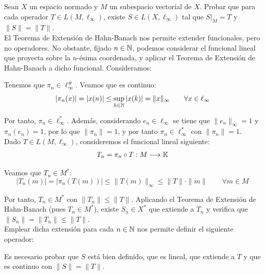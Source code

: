 \begin{ejercicio}
Sean $X$ un espacio normado y $M$ un subespacio vectorial de $X$. Probar que para cada operador $T \in L(M, \ell_\infty)$, existe $S \in L(X, \ell_\infty)$ tal que $S|_M = T$ y $\|S\| = \|T\|$.\\

    El Teorema de Extensión de Hahn-Banach nos permite extender funcionales, pero no operadores. No obstante, fijado $n\in \mathbb{N}$, podemos considerar el funcional lineal que proyecta sobre la $n$-ésima coordenada, y aplicar el Teorema de Extensión de Hahn-Banach a dicho funcional. Consideramos:

    Tenemos que $\pi_n \in \ell_\infty^{\#}$. Veamos que es continuo:
    \begin{equation*}
        |\pi_n(x)| = |x(n)| \leq \sup_{k \in \mathbb{N}} |x(k)| = \|x\|_\infty\qquad \forall x \in \ell_\infty
    \end{equation*}

    Por tanto, $\pi_n\in \ell_\infty^*$. Además, considerando $e_n \in \ell_\infty$ se tiene que $\|e_n\|_\infty = 1$ y $\pi_n(e_n) = 1$, por lo que $\|\pi_n\| = 1$, y por tanto $\pi_n \in \ell_\infty^*$ con $\|\pi_n\| = 1$.\\

    Dado $T \in L(M, \ell_\infty)$, consideremos el funcional lineal siguiente:
    \begin{align*}
        T_n = \pi_n \circ T: M \longrightarrow \mathbb{K}
    \end{align*}

    Veamos que $T_n \in M^*$:
    \begin{equation*}
        |T_n(m)| = |\pi_n(T(m))| \leq \|T(m)\|_\infty \leq \|T\| \cdot \|m\|\qquad \forall m \in M
    \end{equation*}

    Por tanto, $T_n \in M^*$ con $\|T_n\| \leq \|T\|$. Aplicando el Teorema de Extensión de Hahn-Banach (pues $T_n \in M^*$), existe $S_n \in X^*$ que extiende a $T_n$ y verifica que $\|S_n\| = \|T_n\| \leq \|T\|$.\\

    Emplear dicha extensión para cada $n \in \mathbb{N}$ nos permite definir el siguiente operador:

    Es necesario probar que $S$ está bien definido, que es lineal, que extiende a $T$ y que es continuo con $\|S\| = \|T\|$.\\


\end{ejercicio}
